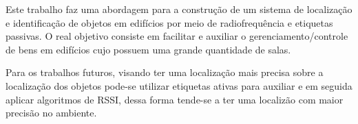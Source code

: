 \label{chapter:consideracoes}
Este trabalho faz uma abordagem para a construção de um sistema de localização e identificação de objetos em edifícios por meio de radiofrequência e etiquetas passivas. O real objetivo consiste em facilitar e auxiliar o gerenciamento/controle de bens em edifícios cujo possuem uma grande quantidade de salas.

\par
Para os trabalhos futuros, visando ter uma localização mais precisa sobre a localização dos objetos pode-se utilizar etiquetas ativas para auxiliar e em seguida aplicar algoritmos de RSSI, dessa forma tende-se a ter uma localizão com maior precisão no ambiente.